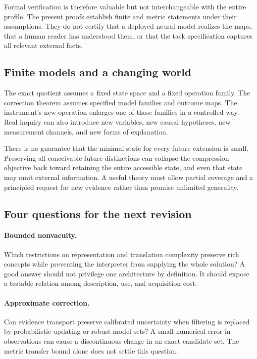 \documentclass[11pt,letterpaper]{article}
\theoremstyle{plain}
\theoremstyle{definition}
\begin{document}
Formal verification is therefore valuable but not interchangeable with the entire profile. The present proofs establish finite and metric statements under their assumptions. They do not certify that a deployed neural model realizes the maps, that a human reader has understood them, or that the task specification captures all relevant external facts.

\subsection{Finite models and a changing world}
The exact quotient assumes a fixed state space and a fixed operation family. The correction theorem assumes specified model families and outcome maps. The instrument's new operation enlarges one of those families in a controlled way. Real inquiry can also introduce new variables, new causal hypotheses, new measurement channels, and new forms of explanation.

There is no guarantee that the minimal state for every future extension is small. Preserving all conceivable future distinctions can collapse the compression objective back toward retaining the entire accessible state, and even that state may omit external information. A useful theory must allow partial coverage and a principled request for new evidence rather than promise unlimited generality.

\subsection{Four questions for the next revision}
\paragraph{Bounded nonvacuity.}
Which restrictions on representation and translation complexity preserve rich concepts while preventing the interpreter from supplying the whole solution? A good answer should not privilege one architecture by definition. It should expose a testable relation among description, use, and acquisition cost.

\paragraph{Approximate correction.}
Can evidence transport preserve calibrated uncertainty when filtering is replaced by probabilistic updating or robust model sets? A small numerical error in observations can cause a discontinuous change in an exact candidate set. The metric transfer bound alone does not settle this question.
\end{document}
